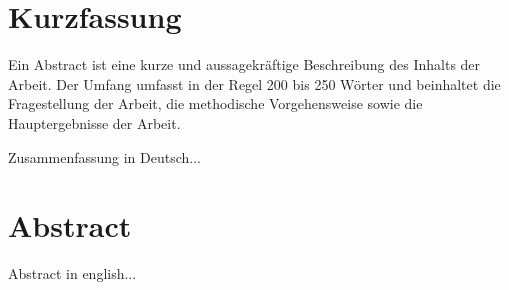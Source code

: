\chapter*{Kurzfassung}
\label{cha:abstract}
Ein Abstract ist eine kurze und aussagekräftige Beschreibung des Inhalts der Arbeit. Der Umfang umfasst in der Regel 200 bis 250 Wörter und beinhaltet die Fragestellung der Arbeit, die methodische Vorgehensweise
sowie die Hauptergebnisse der Arbeit.

Zusammenfassung in Deutsch...

\chapter*{Abstract}
Abstract in english...

\cleardoublepage
